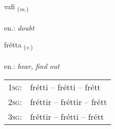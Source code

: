 \documentclass[frontgrid, backgrid]{flacards}\usepackage[]{graphicx}\usepackage[]{xcolor}
\begin{document}
\renewcommand{\flhead}{\vskip5pt \fboxsep=0pt {\small\bfseries\footnotesize Nafnorð | Noun}}
\renewcommand{\fcfoot}{\vskip5pt \fboxsep=0pt \hspace{2pt}{\small\bfseries\footnotesize 2K}}

\renewcommand{\blhead}{\vskip5pt {\small\bfseries\footnotesize Nafnorð | Noun }}
\renewcommand{\bcfoot}{\vskip5pt \hspace{2pt}{\small\bfseries\footnotesize 2K}}


{vafi \small{\textsubscript{(\textit{m.})}} \\[1ex] %
\textphonetic{[vaːvɪ]} \\
en.: \emph{doubt} \\  [2ex]
\renewcommand*{\arraystretch}{0.8}
}

\renewcommand{\flhead}{\vskip5pt \fboxsep=0pt {\small\bfseries\footnotesize Sagnorð | Verb}}
\renewcommand{\fcfoot}{\vskip5pt \fboxsep=0pt \hspace{2pt}{\small\bfseries\footnotesize 2K}}

\renewcommand{\blhead}{\vskip5pt {\small\bfseries\footnotesize Sagnorð | Verb }}
\renewcommand{\bcfoot}{\vskip5pt \hspace{2pt}{\small\bfseries\footnotesize 2K}}


{frétta \small{\textsubscript{(\textit{v.})}} \\[1ex] %
\textphonetic{[frjɛhta]} \\
en.: \emph{hear, find out} \\  [2ex]
\renewcommand*{\arraystretch}{0.8}
\begin{tabular}{p{1cm}l}
\textsc{1sg}: & frétti -- frétti -- frétt \\ 
\textsc{2sg}: & fréttir -- fréttir -- frétt \\ 
\textsc{3sg}: & fréttir -- frétti -- frétt \\ 
\end{tabular}
}
\end{document}
